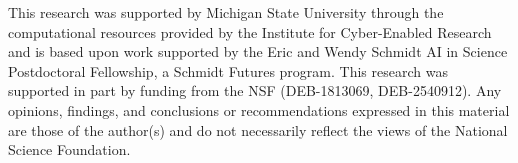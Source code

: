\begin{acks}

This research was supported by Michigan State University through the computational resources provided by the Institute for Cyber-Enabled Research and is based upon work supported by the Eric and Wendy Schmidt AI in Science Postdoctoral Fellowship, a Schmidt Futures program.
This research was supported in part by funding from the NSF (DEB-1813069, DEB-2540912).
Any opinions, findings, and conclusions or recommendations expressed in this material are those of the author(s) and do not necessarily reflect the views of the National Science Foundation.

\end{acks}
